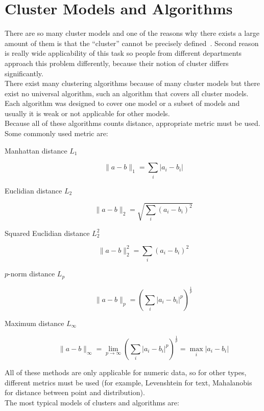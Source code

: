 \section{Cluster Models and Algorithms} \label{sec:clustermodels}
There are so many cluster models and one of the reasons why there exists a large amount of them is that the ``cluster'' cannot be precisely defined~\cite{EstivillCastro02}. Second reason is really wide applicability of this task so people from different departments approach this problem differently, because their notion of cluster differs significantly. \\

There exist many clustering algorithms because of many cluster models but there exist no universal algorithm, such an algorithm that covers all cluster models. Each algorithm was designed to cover one model or a subset of models and usually it is weak or not applicable for other models.\\
Because all of these algorithms counts distance, appropriate metric must be used. Some commonly used metric are:
\begin{description}
\item[Manhattan distance $L_1$] $$\|a-b\|_1=\sum_i |a_i - b_i| $$
\item[Euclidian distance $L_2$] $$\|a-b\|_2=\sqrt{\sum_i (a_i - b_i)^2 }$$
\item[Squared Euclidian distance $L_2^2$] $$\|a-b\|_2^2=\sum_i (a_i - b_i)^2 $$
\item[$p$-norm distance $L_p$] $$\|a-b\|_p=(\sum_i |a_i - b_i|^p)^\frac{1}{p} $$
\item[Maximum distance $L_\infty$] $$\|a-b\|_\infty=\lim_{p\to\infty}(\sum_i |a_i - b_i|^p)^\frac{1}{p}=\max_i |a_i - b_i| $$
\end{description}
All of these methods are only applicable for numeric data, so for other types, different metrics must be used (for example, Levenshtein for text, Mahalanobis for distance between point and distribution).
\\
The most typical models of clusters and algorithms are:
